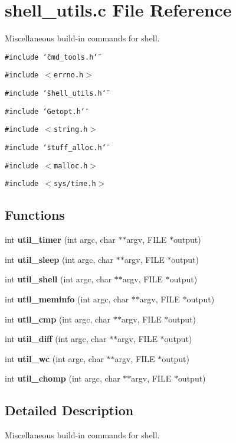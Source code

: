 \section{shell\_\-utils.c File Reference}
\label{shell__utils_8c}
Miscellaneous build-in commands for shell. 

{\tt \#include \char`\"{}cmd\_\-tools.h\char`\"{}}\par
{\tt \#include $<$errno.h$>$}\par
{\tt \#include \char`\"{}shell\_\-utils.h\char`\"{}}\par
{\tt \#include \char`\"{}Getopt.h\char`\"{}}\par
{\tt \#include $<$string.h$>$}\par
{\tt \#include \char`\"{}stuff\_\-alloc.h\char`\"{}}\par
{\tt \#include $<$malloc.h$>$}\par
{\tt \#include $<$sys/time.h$>$}\par
\subsection*{Functions}
\begin{CompactItemize}
\item 
int {\bf util\_\-timer} (int argc, char $\ast$$\ast$argv, FILE $\ast$output)
\item 
int {\bf util\_\-sleep} (int argc, char $\ast$$\ast$argv, FILE $\ast$output)
\item 
int {\bf util\_\-shell} (int argc, char $\ast$$\ast$argv, FILE $\ast$output)
\item 
int {\bf util\_\-meminfo} (int argc, char $\ast$$\ast$argv, FILE $\ast$output)
\item 
int {\bf util\_\-cmp} (int argc, char $\ast$$\ast$argv, FILE $\ast$output)
\item 
int {\bf util\_\-diff} (int argc, char $\ast$$\ast$argv, FILE $\ast$output)
\item 
int {\bf util\_\-wc} (int argc, char $\ast$$\ast$argv, FILE $\ast$output)
\item 
int {\bf util\_\-chomp} (int argc, char $\ast$$\ast$argv, FILE $\ast$output)
\end{CompactItemize}


\subsection{Detailed Description}
Miscellaneous build-in commands for shell. 

